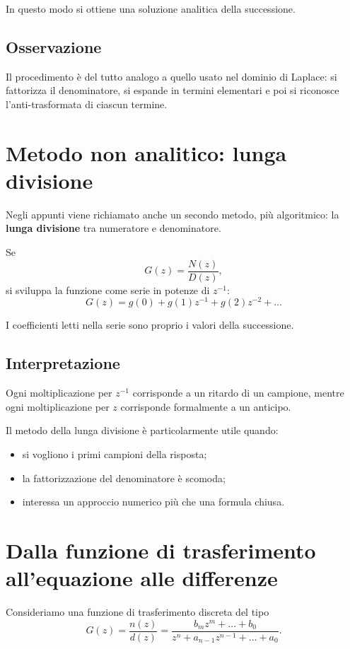 In questo modo si ottiene una soluzione analitica della successione.

\subsection*{Osservazione}

Il procedimento \`e del tutto analogo a quello usato nel dominio di Laplace:
si fattorizza il denominatore, si espande in termini elementari e poi si riconosce
l'anti-trasformata di ciascun termine.

\section{Metodo non analitico: lunga divisione}

Negli appunti viene richiamato anche un secondo metodo, pi\`u algoritmico:
la \textbf{lunga divisione} tra numeratore e denominatore.

Se
\[
G(z)=\frac{N(z)}{D(z)},
\]
si sviluppa la funzione come serie in potenze di \(z^{-1}\):
\[
G(z)=g(0)+g(1)z^{-1}+g(2)z^{-2}+\dots
\]

I coefficienti letti nella serie sono proprio i valori della successione.

\subsection*{Interpretazione}

Ogni moltiplicazione per \(z^{-1}\) corrisponde a un ritardo di un campione,
mentre ogni moltiplicazione per \(z\) corrisponde formalmente a un anticipo.

Il metodo della lunga divisione \`e particolarmente utile quando:
\begin{itemize}
    \item si vogliono i primi campioni della risposta;
    \item la fattorizzazione del denominatore \`e scomoda;
    \item interessa un approccio numerico pi\`u che una formula chiusa.
\end{itemize}

\section{Dalla funzione di trasferimento all'equazione alle differenze}

Consideriamo una funzione di trasferimento discreta del tipo
\[
G(z)=\frac{n(z)}{d(z)}
=
\frac{b_m z^m+\dots+b_0}{z^n+a_{n-1}z^{n-1}+\dots+a_0}.
\]

